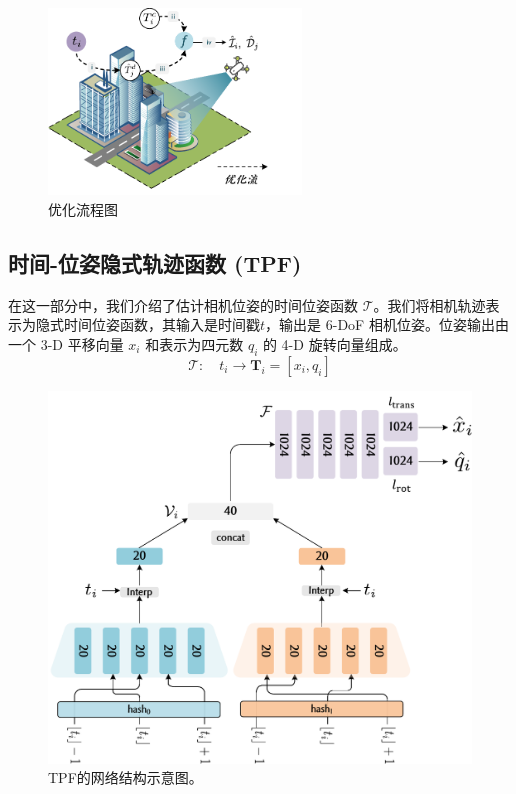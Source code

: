 \begin{figure}[ht]
    \centering
    \includegraphics[width=0.6\textwidth]{undergraduate-thesis/images/time-pose function/Problem Formulation export.pdf}
    \caption{优化流程图}
    \label{fig:time-pose function optimization flow}
\end{figure}

\subsection{时间-位姿隐式轨迹函数 (TPF)}
在这一部分中，我们介绍了估计相机位姿的时间位姿函数 $\mathcal{T}$。我们将相机轨迹表示为隐式时间位姿函数，其输入是时间戳$t$，输出是 6-DoF 相机位姿。位姿输出由一个 3-D 平移向量 $x_i$ 和表示为四元数\cite{sola_micro_2021} $q_i$ 的 4-D 旋转向量组成。
\begin{equation}
    \mathcal{T}:\quad t_i\to\mathbf{T}_i=[x_i, q_i]
\end{equation}

\begin{figure}[ht]
    \centering
    \includegraphics[width=\textwidth]{undergraduate-thesis/images/time-pose function/Hash.pdf}
    \caption{TPF的网络结构示意图。}
    \label{fig:time-pose function structure}
\end{figure}

